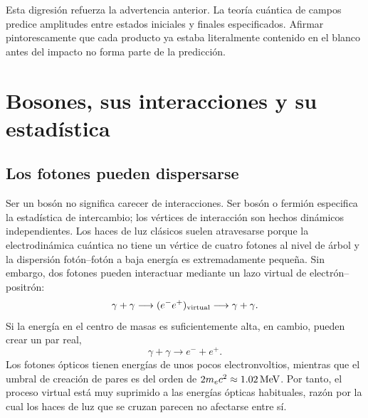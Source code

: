 Esta digresión refuerza la advertencia anterior. La teoría cuántica de campos predice
amplitudes entre estados iniciales y finales especificados. Afirmar pintorescamente
que cada producto ya estaba literalmente contenido en el blanco antes del impacto
no forma parte de la predicción.

\section{Bosones, sus interacciones y su estadística}

\subsection{Los fotones pueden dispersarse}

Ser un bosón no significa carecer de interacciones. Ser bosón o fermión especifica
la estadística de intercambio; los vértices de interacción son hechos dinámicos
independientes. Los haces de luz clásicos suelen atravesarse porque la electrodinámica
cuántica no tiene un vértice de cuatro fotones al nivel de árbol y la dispersión
fotón--fotón a baja energía es extremadamente pequeña. Sin embargo, dos
fotones pueden interactuar mediante un lazo virtual de electrón--positrón:
\begin{equation}
  \gamma+\gamma
  \longrightarrow(e^-e^+)_{\rm virtual}
  \longrightarrow\gamma+\gamma.
\end{equation}
Si la energía en el centro de masas es suficientemente alta, en cambio, pueden crear
un par real,
\begin{equation}
  \gamma+\gamma\longrightarrow e^-+e^+.
\end{equation}
Los fotones ópticos tienen energías de unos pocos electronvoltios, mientras que el
umbral de creación de pares es del orden de \(2m_e c^2\approx1.02\,{\rm MeV}\). Por tanto, el proceso virtual
está muy suprimido a las energías ópticas habituales, razón por la cual los haces de luz que se cruzan parecen no afectarse entre sí.

\begin{classroomqa}
\end{classroomqa}

